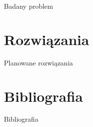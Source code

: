 \documentclass[10pt]{beamer}
\begin{document}
\begin{frame}{Badany problem}

 
\end{frame}

\section{Rozwiązania}
 
\begin{frame}{Planowane rozwiązania}

 
\end{frame}

\section{Bibliografia}
\begin{frame}[allowframebreaks]{Bibliografia}


\nocite{*}
\end{frame}
\end{document}
